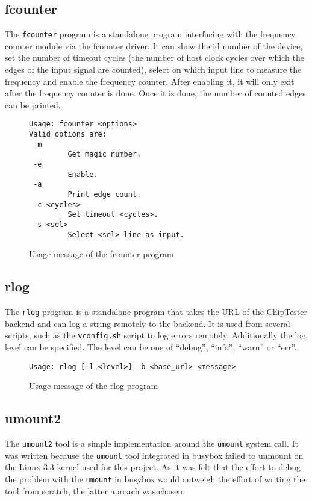 \subsection{fcounter}
The \texttt{fcounter} program is a standalone program interfacing with the frequency
counter module via the fcounter driver. It can show the id number of the device,
set the number of timeout cycles (the number of host clock cycles over which the
edges of the input signal are counted), select on which input line to measure the
frequency and enable the frequency counter. After enabling it, it will only exit
after the frequency counter is done. Once it is done, the number of counted edges
can be printed.

\begin{figure}[h!]
\lstset{basicstyle=\scriptsize\ttfamily}
\begin{lstlisting}
Usage: fcounter <options>
Valid options are:
 -m
         Get magic number.
 -e
         Enable.
 -a
         Print edge count.
 -c <cycles>
         Set timeout <cycles>.
 -s <sel>
         Select <sel> line as input.
\end{lstlisting}
\caption{Usage message of the fcounter program}
\end{figure}


\subsection{rlog}
The \texttt{rlog} program is a standalone program that takes the URL of the ChipTester
backend and can log a string remotely to the backend. It is used from several scripts, such
as the \texttt{vconfig.sh} script to log errors remotely. Additionally the log level can be
specified. The level can be one of ``debug'', ``info'', ``warn'' or ``err''.
\begin{figure}[h!]
 \lstset{basicstyle=\scriptsize\ttfamily}
\begin{lstlisting}
Usage: rlog [-l <level>] -b <base_url> <message>
\end{lstlisting}
\caption{Usage message of the rlog program}
\end{figure}


\subsection{umount2}
The \texttt{umount2} tool is a simple implementation around the \texttt{umount} system call.
It was written because the \texttt{umount} tool integrated in busybox failed to unmount
on the Linux 3.3 kernel used for this project. As it was felt that the effort to debug
the problem with the \texttt{umount} in busybox would outweigh the effort of writing the tool
from scratch, the latter aproach was chosen.
\\

